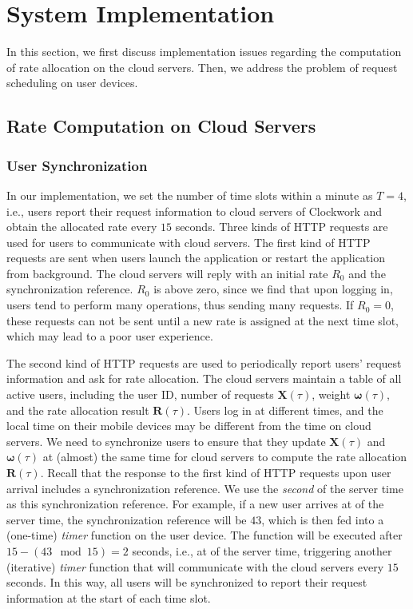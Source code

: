 \section{System Implementation} \label{sec:implementation}

In this section, we first discuss implementation issues regarding the computation of rate allocation on the cloud servers. Then, we address the problem of request scheduling on user devices.


\subsection{Rate Computation on Cloud Servers}

\subsubsection{User Synchronization}

In our implementation, we set the number of time slots within a minute as $T = 4$, i.e., users report their request information to cloud servers of Clockwork and obtain the allocated rate every $15$ seconds. Three kinds of HTTP requests are used for users to communicate with cloud servers. The first kind of HTTP requests are sent when users launch the application or restart the application from background. The cloud servers will reply with an initial rate $R_0$ and the synchronization reference. $R_0$ is above zero, since we find that upon logging in, users tend to perform many operations, thus sending many requests. If $R_0=0$, these requests can not be sent until a new rate is assigned at the next time slot, which may lead to a poor user experience.
 

The second kind of HTTP requests are used to periodically report users' request information and ask for rate allocation. The cloud servers maintain a table of all active users, including the user ID, number of requests $\pmb{X}(\tau)$, weight $\pmb{\omega}(\tau)$, and the rate allocation result $\pmb{R}(\tau)$. Users log in at different times, and the local time on their mobile devices may be different from the time on cloud servers. We need to synchronize users to ensure that they update $\pmb{X}(\tau)$ and $\pmb{\omega}(\tau)$ at (almost) the same time for cloud servers to compute the rate allocation $\pmb{R}(\tau)$. Recall that the response to the first kind of HTTP requests upon user arrival includes a synchronization reference. We use the \emph{second} of the server time as this synchronization reference. For example, if a new user arrives at  of the server time, the synchronization reference will be $43$, which is then fed into a (one-time) \emph{timer} function on the user device. The function will be executed after $15-(43\mod 15) = 2$ seconds, i.e., at  of the server time, triggering another (iterative) \emph{timer} function that will communicate with the cloud servers every $15$ seconds. In this way, all users will be synchronized to report their request information at the start of each time slot.

